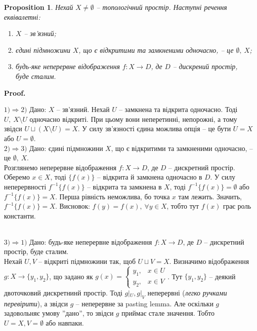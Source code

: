 \documentclass[a4paper, 10pt]{article}
\makeatletter
\theoremstyle{theoremdd}
\newtheorem{proposition}[theorem]{Proposition}
\renewenvironment{proof}[1][Proof.\\]{\par
\pushQED{\hfill \qed}%
\normalfont \topsep6\p@\@plus6\p@\relax
\trivlist
\item\relax
{\bfseries
#1\@addpunct{.}}\hspace\labelsep\ignorespaces
}{%
\popQED\endtrivlist\@endpefalse
}
\makeatother
\begin{document}
\begin{proposition}
Нехай $X \neq \emptyset$ -- топологічний простір. Наступні речення еквівалетні:
\begin{enumerate}[nosep,wide=0pt,label={\arabic*)}]
\item $X$ -- зв'язний;
\item єдині підмножини $X$, що є відкритими та замкненими одночасно, -- це $\emptyset,\ X$;
\item будь-яке неперервне відображення $f \colon X \to D$, де $D$ -- дискрений простір, буде сталим.
\end{enumerate}

\end{proposition}

\begin{proof}
$\boxed{1) \Rightarrow 2)}$ Дано: $X$ -- зв'язний. Нехай $U$ -- замкнена та відкрита одночасно. Тоді $U,\ X \setminus U$ одночасно відкриті. При цьому вони неперетинні, непорожні, а тому звідси $U \sqcup (X \setminus U) = X$. У силу зв'язності єдина можлива опція -- це бути $U = X$ або $U = \emptyset$.
\bigskip \\
$\boxed{2) \Rightarrow 3)}$ Дано: єдині підмножини $X$, що є відкритими та замкненими одночасно, -- це $\emptyset,\ X$.\\
Розглянемо неперервне відображення $f \colon X \to D$, де $D$ -- дискретний простір. Оберемо $x \in X$, тоді $\{f(x)\}$ -- відкрита й замкнена одночасно в $D$. У силу неперервності $f^{-1}\{f(x)\}$ -- відкрита та замкнена в $X$, тоді $f^{-1}\{f(x)\} = \emptyset$ або $f^{-1}\{f(x)\} = X$. Перша рівність неможлива, бо точка $x$ там лежить. Значить, $f^{-1}\{f(x)\} = X$. Висновок: $f(y) = f(x),\ \forall y \in X$, тобто тут $f(x)$ грає роль константи.

\bigskip \\
$\boxed{3) \Rightarrow 1)}$ Дано: будь-яке неперервне відображення $f \colon X \to D$, де $D$ -- дискретний простір, буде сталим.\\
Нехай $U,V$ -- відкриті підмножини так, щоб $U \sqcup V = X$. Визначимо відображення $g \colon X \to \{y_1,y_2\}$, що задано як $g(x) = \begin{cases} y_1, & x \in U \\ y_2, & x \in V \end{cases}$. Тут $\{y_1,y_2\}$ -- деякий двоточковий дискретнинй простір. Тоді $g|_U, g|_V$ неперервні (\textit{легко ручками перевірити}), а звідси $g$ -- неперервне за pasting lemma. Але оскільки $g$ задовольняє умову ''дано'', то звідси $g$ приймає стале значення. Тобто $U = X, V = \emptyset$ або навпаки.
\end{proof}
\end{document}
